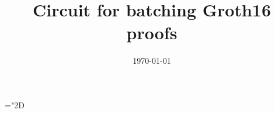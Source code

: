 \documentclass[11pt]{article}
\title{%
Circuit for batching Groth16 proofs}
\date{\today}
\author{}
\numberwithin{figure}{section} %
\newcommand{\set}[1]{\ensuremath{\left\{#1\right\}}\xspace}
\begin{document}
\maketitle
 \mathchardef\mhyphen="2D

\newcommand{\G}{\ensuremath{{\mathbb G}}\xspace}
\newcommand{\Gstar}{\ensuremath{{\mathbb G}^*}\xspace}

\newcommand{\grouppair}{\ensuremath{G^*}\xspace}

\newcommand{\Gt}{\ensuremath{{\mathbb G}_t}\xspace}
\newcommand{\F}{\ensuremath{\mathbb F}\xspace}
\newcommand{\Fstar}{\ensuremath{\mathbb F^*}\xspace}

\newcommand{\help}[1]{$#1$-helper\xspace}
\newcommand{\randompair}[1]{\ensuremath{\mathsf{randomPair}(#1)}\xspace}
\newcommand{\pair}[1]{$#1$-pair\xspace}
\newcommand{\pairs}[1]{$#1$-pairs\xspace}

\newcommand{\pairone}[1]{\G1-$#1$-pair\xspace}
\newcommand{\pairtwo}[1]{\G2-$#1$-pair\xspace}
\newcommand{\sameratio}[2]{\ensuremath{\mathsf{SameRatio}(#1,#2)}\xspace}
\newcommand{\vecc}[2]{\ensuremath{(#1)_{#2}}\xspace}
\newcommand{\players}{\ensuremath{[n]}\xspace}
\newcommand{\adv}{\ensuremath{\mathcal A}\xspace}
\newcommand{\advprime}{\ensuremath{A'}\xspace}
\newcommand{\extprime}{\ensuremath{E'}\xspace}
\newcommand{\advrand}{\ensuremath{\mathsf{rand}_{\adv}}\xspace}

\newcommand{\ci}{\ensuremath{\mathrm{CI}}\xspace}
\newcommand{\pairvec}[1]{$#1$-vector\xspace}
\newcommand{\Fq}{\ensuremath{\mathbb{F}_q}\xspace}
\newcommand{\randpair}[1]{\ensuremath{\mathsf{rp}_{#1}}\xspace}
\newcommand{\randpairone}[1]{\ensuremath{\mathsf{rp}_{#1}^{1}}\xspace}
\newcommand{\abase}{\ensuremath{A_{\mathrm{\mathbf{0}}}}\xspace}
\newcommand{\bbase}{\ensuremath{B_{\mathrm{\mathbf{0}}}}\xspace}
\newcommand{\cbase}{\ensuremath{C_{\mathrm{\mathbf{0}}}}\xspace}

\newcommand{\amid}{\ensuremath{A_{\mathrm{mid}}}\xspace}
\newcommand{\bmid}{\ensuremath{B_{\mathrm{mid}}}\xspace}
\newcommand{\cmid}{\ensuremath{C_{\mathrm{mid}}}\xspace}

\newcommand{\negl}{\ensuremath{\mathsf{negl}(\lambda)}\xspace}
\newcommand{\randpairtwo}[1]{\ensuremath{\mathsf{rp_{#1}^2}}\xspace}%
\newcommand{\nilp}{\ensuremath{\mathscr N}\xspace}
\newcommand{\snark}{\ensuremath{\mathscr S}\xspace}
\newcommand{\groupgen}{\ensuremath{\mathscr G}\xspace}
\newcommand{\qap}{\ensuremath{\mathscr Q}\xspace}
\end{document}

